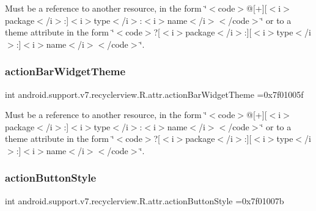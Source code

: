 Must be a reference to another resource, in the form \char`\"{}$<$code$>$@\mbox{[}+\mbox{]}\mbox{[}$<$i$>$package$<$/i$>$\+:\mbox{]}$<$i$>$type$<$/i$>$\+:$<$i$>$name$<$/i$>$$<$/code$>$\char`\"{} or to a theme attribute in the form \char`\"{}$<$code$>$?\mbox{[}$<$i$>$package$<$/i$>$\+:\mbox{]}\mbox{[}$<$i$>$type$<$/i$>$\+:\mbox{]}$<$i$>$name$<$/i$>$$<$/code$>$\char`\"{}. \mbox{\label{classandroid_1_1support_1_1v7_1_1recyclerview_1_1R_1_1attr_acc5a4c744602c8b2d51d4538a871cec0}} 
\subsubsection{\texorpdfstring{action\+Bar\+Widget\+Theme}{actionBarWidgetTheme}}
{\footnotesize\ttfamily int android.\+support.\+v7.\+recyclerview.\+R.\+attr.\+action\+Bar\+Widget\+Theme =0x7f01005f\hspace{0.3cm}{\ttfamily [static]}}

Must be a reference to another resource, in the form \char`\"{}$<$code$>$@\mbox{[}+\mbox{]}\mbox{[}$<$i$>$package$<$/i$>$\+:\mbox{]}$<$i$>$type$<$/i$>$\+:$<$i$>$name$<$/i$>$$<$/code$>$\char`\"{} or to a theme attribute in the form \char`\"{}$<$code$>$?\mbox{[}$<$i$>$package$<$/i$>$\+:\mbox{]}\mbox{[}$<$i$>$type$<$/i$>$\+:\mbox{]}$<$i$>$name$<$/i$>$$<$/code$>$\char`\"{}. \mbox{\label{classandroid_1_1support_1_1v7_1_1recyclerview_1_1R_1_1attr_a083465e51b4441e6aefe20067fa4824a}} 
\subsubsection{\texorpdfstring{action\+Button\+Style}{actionButtonStyle}}
{\footnotesize\ttfamily int android.\+support.\+v7.\+recyclerview.\+R.\+attr.\+action\+Button\+Style =0x7f01007b\hspace{0.3cm}{\ttfamily [static]}}

